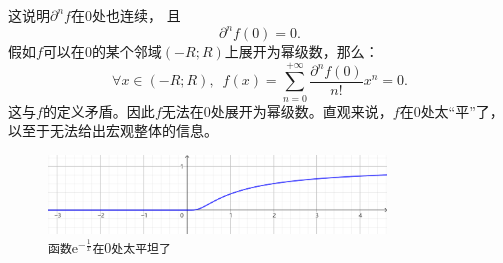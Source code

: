 \documentclass[12pt,UTF8]{ctexbook}
\theoremstyle{definition}
\theoremstyle{plain}
\newtheorem{sk}{思考}[section]
\begin{document}
\begin{appendix}
这说明$\partial^n f$在$0$处也连续，
且
$$ \partial^n f(0) = 0.$$
假如$f$可以在$0$的某个邻域$(-R;R)$上展开为幂级数，那么：
$$ \forall x \in (-R;R) ,\,\,\, f(x) = \sum_{n=0}^{+\infty} \frac{\partial^n f(0)}{n!} x^n = 0. $$
这与$f$的定义矛盾。因此$f$无法在$0$处展开为幂级数。直观来说，$f$在$0$处太“平”了，以至于无法给出宏观整体的信息。

\begin{figure}[h] %
    \centering
    \includegraphics[width=0.8\textwidth]{tu/幂级数2.png}
    \caption*{\texttt{函数}$\displaystyle \mathrm{e}^{-\frac{1}{x}}$\texttt{在}$0$\texttt{处太平坦了}}
\end{figure}



\end{appendix}
\end{document}
